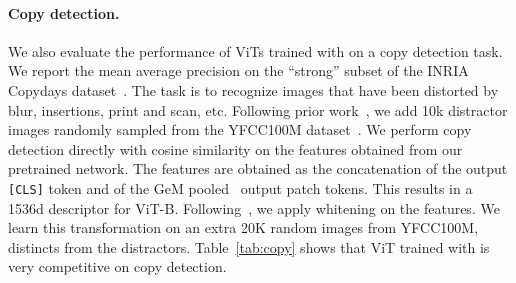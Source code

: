 \paragraph{Copy detection.}
We also evaluate the performance of ViTs trained with \OURS on a copy detection task.
We report the mean average precision on the ``strong'' subset of the INRIA Copydays dataset~\cite{douze2009evaluation}.
The task is to recognize images that have been distorted by blur, insertions, print and scan, etc. 
Following prior work~\cite{berman2019multigrain}, we add 10k distractor images randomly sampled from the YFCC100M dataset~\cite{thomee2015yfcc100m}.
We perform copy detection directly with cosine similarity on the features obtained from our pretrained network.
The features are obtained as the concatenation of the output \texttt{[CLS]} token and of the GeM pooled~\cite{radenovic2018fine} output patch tokens.
This results in a 1536d descriptor for ViT-B.
Following~\cite{berman2019multigrain}, we apply whitening on the features.
We learn this transformation on an extra 20K random images from YFCC100M, distincts from the distractors.
Table~\ref{tab:copy} shows that ViT trained with \OURS is very competitive on copy detection.

